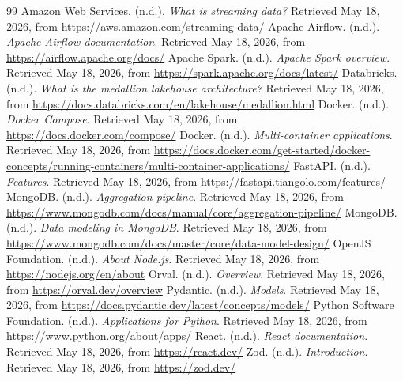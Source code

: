 \documentclass[12pt,a4paper]{article}
\begin{document}
\begin{thebibliography}{99}
 Amazon Web Services. (n.d.). \textit{What is streaming data?} Retrieved May 18, 2026, from \url{https://aws.amazon.com/streaming-data/}
 Apache Airflow. (n.d.). \textit{Apache Airflow documentation}. Retrieved May 18, 2026, from \url{https://airflow.apache.org/docs/}
 Apache Spark. (n.d.). \textit{Apache Spark overview}. Retrieved May 18, 2026, from \url{https://spark.apache.org/docs/latest/}
 Databricks. (n.d.). \textit{What is the medallion lakehouse architecture?} Retrieved May 18, 2026, from \url{https://docs.databricks.com/en/lakehouse/medallion.html}
 Docker. (n.d.). \textit{Docker Compose}. Retrieved May 18, 2026, from \url{https://docs.docker.com/compose/}
 Docker. (n.d.). \textit{Multi-container applications}. Retrieved May 18, 2026, from \url{https://docs.docker.com/get-started/docker-concepts/running-containers/multi-container-applications/}
 FastAPI. (n.d.). \textit{Features}. Retrieved May 18, 2026, from \url{https://fastapi.tiangolo.com/features/}
 MongoDB. (n.d.). \textit{Aggregation pipeline}. Retrieved May 18, 2026, from \url{https://www.mongodb.com/docs/manual/core/aggregation-pipeline/}
 MongoDB. (n.d.). \textit{Data modeling in MongoDB}. Retrieved May 18, 2026, from \url{https://www.mongodb.com/docs/master/core/data-model-design/}
 OpenJS Foundation. (n.d.). \textit{About Node.js}. Retrieved May 18, 2026, from \url{https://nodejs.org/en/about}
 Orval. (n.d.). \textit{Overview}. Retrieved May 18, 2026, from \url{https://orval.dev/overview}
 Pydantic. (n.d.). \textit{Models}. Retrieved May 18, 2026, from \url{https://docs.pydantic.dev/latest/concepts/models/}
 Python Software Foundation. (n.d.). \textit{Applications for Python}. Retrieved May 18, 2026, from \url{https://www.python.org/about/apps/}
 React. (n.d.). \textit{React documentation}. Retrieved May 18, 2026, from \url{https://react.dev/}
 Zod. (n.d.). \textit{Introduction}. Retrieved May 18, 2026, from \url{https://zod.dev/}

\end{thebibliography}
\end{document}
